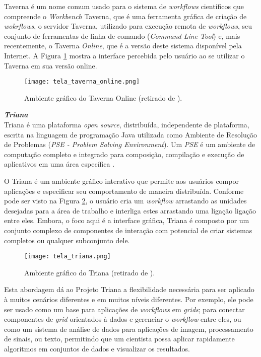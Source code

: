 Taverna é um nome comum usado para o sistema de \textit{workflows} científicos que compreende o \textit{Workbench} Taverna, que é uma ferramenta gráfica de criação de \textit{wokrflows}, o servidor Taverna, utilizado para execução remota de \textit{workflows}, seu conjunto de ferramentas de linha de comando (\textit{Command Line Tool}) e, mais recentemente, o Taverna \textit{Online}, que é a versão deste sistema disponível pela Internet. A Figura \ref{fig:tela_taverna} mostra a interface percebida pelo usuário ao se utilizar o Taverna em sua versão online. \\

\begin{figure}[ht]
	\centering
	\texttt{[image: tela\_taverna\_online.png]}
	\caption{Ambiente gráfico do Taverna Online (retirado de \cite{taverna_screen}).}
	\label{fig:tela_taverna}
\end{figure}
 
\noindent
\textbf{\textit{Triana}} \\

\noindent 
Triana \cite{triana_1} \cite{can_one_size_fit_all} é uma plataforma \textit{open source}, distribuída, independente de plataforma, escrita na linguagem de programação Java utilizada como Ambiente de Resolução de Problemas (\textit{PSE - Problem Solving Environment}). Um \textit{PSE} é um ambiente de computação completo e integrado para composição, compilação e execução de aplicativos em uma área específica \cite{problem_solving}. 

O Triana é um ambiente gráfico interativo que permite aos usuários compor aplicações e especificar seu comportamento de maneira distribuída. Conforme pode ser visto na Figura \ref{fig:tela_triana}, o usuário cria um \textit{workflow} arrastando as unidades desejadas para a área de trabalho e interliga estes arrastando uma ligação ligação entre eles. Embora, o foco aqui é a interface gráfica, Triana é composto por um conjunto complexo de componentes de interação com potencial de criar sistemas completos ou qualquer subconjunto dele. 

\begin{figure}[ht]
	\centering
	\texttt{[image: tela\_triana.png]}
	\caption{Ambiente gráfico do Triana (retirado de \cite{triana_screen}).}
	\label{fig:tela_triana}
\end{figure}

Esta abordagem dá ao Projeto Triana a flexibilidade necessária para ser aplicado à muitos cenários diferentes e em muitos níveis diferentes. Por exemplo, ele pode ser usado como um base para aplicações de \textit{workflows} em \textit{grids}; para conectar componentes de \textit{grid} orientados à dados e gerenciar o \textit{workflow} entre eles, ou como um sistema de análise de dados para aplicações de imagem, processamento de sinais, ou texto, permitindo que um cientista possa aplicar rapidamente algoritmos em conjuntos de dados e visualizar os resultados. 


